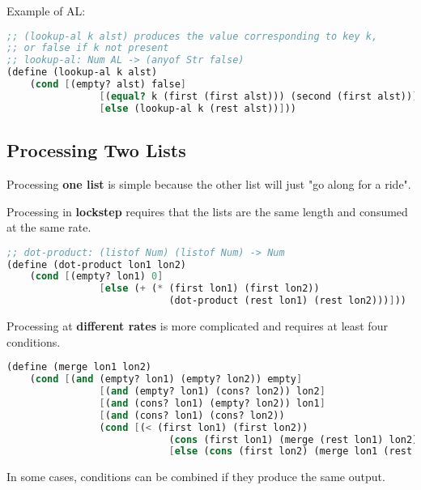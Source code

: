 \documentclass[english, 12pt]{article}
\begin{document}
\begin{exmp}
Example of AL:
\begin{lstlisting}[language=Scheme]
;; (lookup-al k alst) produces the value corresponding to key k,
;; or false if k not present
;; lookup-al: Num AL -> (anyof Str false)
(define (lookup-al k alst)
	(cond [(empty? alst) false]
				[(equal? k (first (first alst))) (second (first alst))]
				[else (lookup-al k (rest alst))]))
\end{lstlisting}
\end{exmp}
\subsection{Processing Two Lists}
\begin{exmp}
Processing \textbf{one list} is simple because the other list will just "go along for a ride".
\end{exmp}
\begin{exmp}
Processing in \textbf{lockstep} requires that the lists are the same length and consumed at the same rate.
\begin{lstlisting}[language=Scheme]
;; dot-product: (listof Num) (listof Num) -> Num
(define (dot-product lon1 lon2)
	(cond [(empty? lon1) 0]
				[else (+ (* (first lon1) (first lon2))
							(dot-product (rest lon1) (rest lon2)))]))
\end{lstlisting}
\end{exmp}
\begin{exmp}
Processing at \textbf{different rates} is more complicated and requires at least four conditions.
\begin{lstlisting}[language=Scheme]
(define (merge lon1 lon2)
	(cond [(and (empty? lon1) (empty? lon2)) empty]
				[(and (empty? lon1) (cons? lon2)) lon2]
				[(and (cons? lon1) (empty? lon2)) lon1]
				[(and (cons? lon1) (cons? lon2))
				(cond [(< (first lon1) (first lon2))
							(cons (first lon1) (merge (rest lon1) lon2))]
							[else (cons (first lon2) (merge lon1 (rest lon2)))])]))
\end{lstlisting}
\end{exmp}
\begin{note}
In some cases, conditions can be combined if they produce the same output.
\end{note}
\end{document}

